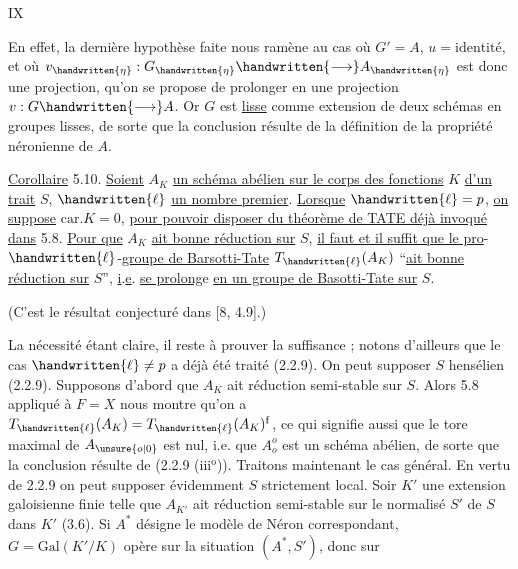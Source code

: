 \hfill IX

En effet, la dernière hypothèse faite nous ramène au cas où
$G'=A$, $u=\text{identité}$, et où $v_{\handwritten{\eta}}:G_{\handwritten{\eta}}\handwritten{\longrightarrow}A_{\handwritten{\eta}}$ est donc une projection, qu'on se propose de prolonger en une projection $v:G\handwritten{\longrightarrow}A$. Or $G$ est \uline{lisse} comme extension de deux schémas en groupes lisses, de sorte que la conclusion résulte de la définition de la propriété néronienne de $A$.

\uline{Corollaire} 5.10. \uline{Soient} $A_K$ \uline{un schéma abélien sur le corps des fonctions} $K$ \uline{d'un trait} $S$, $\handwritten{\ell}$ \uline{un nombre premier}. \uline{Lorsque} $\handwritten{\ell}=p$, \uline{on suppose} $\mathrm{car.}K=0$,
\uline{pour pouvoir disposer du théorème de TATE déjà invoqué dans} 5.8. \uline{Pour que} $A_K$ \uline{ait bonne réduction sur} $S$, \uline{il faut et il suffit que le pro}-$\handwritten{\ell}$-\uline{groupe de Barsotti-Tate} $T_{\handwritten{\ell}}(A_K)$ ``\uline{ait bonne réduction sur} $S$'', \uline{i}.\uline{e}. \uline{se prolong}e \uline{en un groupe de Basotti-Tate sur} $S$.

(C'est le résultat conjecturé dans [8, 4.9].)

La nécessité étant claire, il reste à prouver la suffisance ; notons d'ailleurs que le cas $\handwritten{\ell}\ne p$ a déjà été traité (2.2.9). On peut supposer $S$ hensélien (2.2.9). Supposons d'abord que $A_K$ ait réduction semi-stable sur $S$. Alors 5.8 appliqué à $F=X$ nous montre qu'on a
$T_{\handwritten{\ell}}(A_K)=T_{\handwritten{\ell}}(A_K)^{\mathrm f}$, ce qui signifie aussi que le tore maximal de $A_{\unsure{o|0}}$ est
nul, i.e. que $A_o^o$ est un schéma abélien, de sorte que la conclusion résulte de (2.2.9 (iii$^{\mathrm o}$)). Traitons maintenant le cas général. En vertu de 2.2.9 on peut supposer évidemment $S$ strictement local.
Soir $K'$ une extension galoisienne finie telle que $A_{K'}$ ait réduction semi-stable sur le normalisé $S'$ de $S$ dans $K'$ (3.6). Si $A^*$ désigne le modèle de Néron correspondant, $G=\mathrm{Gal}(K'/K)$ opère sur la situation $(A^*,S')$, donc sur
